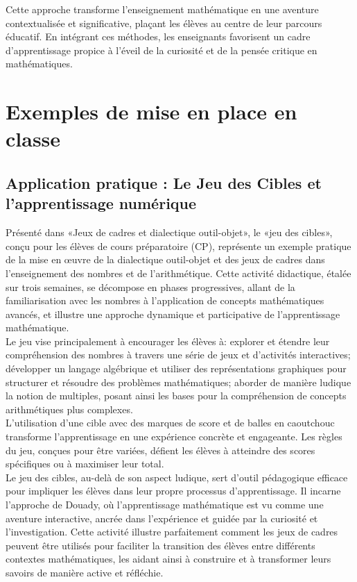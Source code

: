 Cette approche transforme l'enseignement mathématique en une aventure contextualisée et significative,
plaçant les élèves au centre de leur parcours éducatif.
En intégrant ces méthodes,
les enseignants favorisent un cadre d'apprentissage propice à l'éveil de la curiosité et de la pensée critique en mathématiques.

\section{Exemples de mise en place en classe}

\subsection{Application pratique : Le Jeu des Cibles et l'apprentissage numérique}

Présenté dans «Jeux de cadres et dialectique outil-objet»,
le «jeu des cibles»,
conçu pour les élèves de cours préparatoire (CP),
représente un exemple pratique de la mise en œuvre de la dialectique outil-objet et des jeux de cadres dans l'enseignement des nombres et de l'arithmétique.
Cette activité didactique,
étalée sur trois semaines,
se décompose en phases progressives,
allant de la familiarisation avec les nombres à l'application de concepts mathématiques avancés,
et illustre une approche dynamique et participative de l'apprentissage mathématique.\\

Le jeu vise principalement à encourager les élèves à:
explorer et étendre leur compréhension des nombres à travers une série de jeux et d'activités interactives;
développer un langage algébrique et utiliser des représentations graphiques pour structurer et résoudre des problèmes mathématiques;
aborder de manière ludique la notion de multiples,
posant ainsi les bases pour la compréhension de concepts arithmétiques plus complexes.\\

L'utilisation d'une cible avec des marques de score et de balles en caoutchouc transforme l'apprentissage en une expérience concrète et engageante.
Les règles du jeu,
conçues pour être variées,
défient les élèves à atteindre des scores spécifiques ou à maximiser leur total.\\

Le jeu des cibles, au-delà de son aspect ludique,
sert d'outil pédagogique efficace pour impliquer les élèves dans leur propre processus d'apprentissage.
Il incarne l'approche de Douady,
où l'apprentissage mathématique est vu comme une aventure interactive,
ancrée dans l'expérience et guidée par la curiosité et l'investigation.
Cette activité illustre parfaitement comment les jeux de cadres peuvent être utilisés pour faciliter la transition des élèves entre différents contextes mathématiques,
les aidant ainsi à construire et à transformer leurs savoirs de manière active et réfléchie.\\

